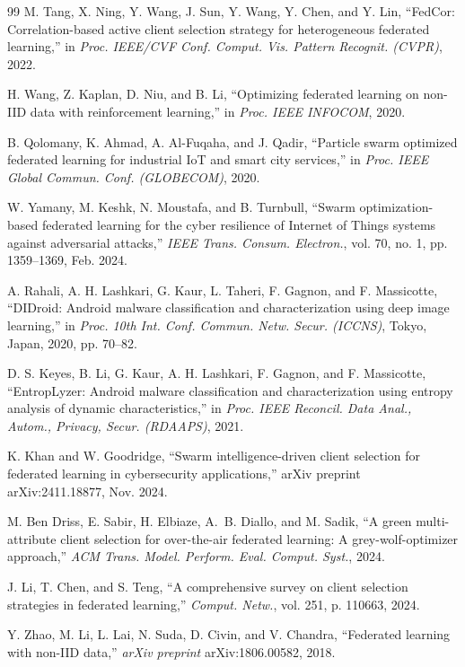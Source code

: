 \documentclass[conference]{IEEEtran}
\begin{document}
\begin{thebibliography}{99}
M. Tang, X. Ning, Y. Wang, J. Sun, Y. Wang, Y. Chen, and Y. Lin, ``FedCor: Correlation-based active client selection strategy for heterogeneous federated learning,'' in \emph{Proc. IEEE/CVF Conf. Comput. Vis. Pattern Recognit. (CVPR)}, 2022.

H. Wang, Z. Kaplan, D. Niu, and B. Li, ``Optimizing federated learning on non-IID data with reinforcement learning,'' in \emph{Proc. IEEE INFOCOM}, 2020.

B. Qolomany, K. Ahmad, A. Al-Fuqaha, and J. Qadir, ``Particle swarm optimized federated learning for industrial IoT and smart city services,'' in \emph{Proc. IEEE Global Commun. Conf. (GLOBECOM)}, 2020.

W. Yamany, M. Keshk, N. Moustafa, and B. Turnbull, ``Swarm optimization-based federated learning for the cyber resilience of Internet of Things systems against adversarial attacks,'' \emph{IEEE Trans. Consum. Electron.}, vol. 70, no. 1, pp. 1359--1369, Feb. 2024.

A. Rahali, A. H. Lashkari, G. Kaur, L. Taheri, F. Gagnon, and F. Massicotte, ``DIDroid: Android malware classification and characterization using deep image learning,'' in \emph{Proc. 10th Int. Conf. Commun. Netw. Secur. (ICCNS)}, Tokyo, Japan, 2020, pp. 70--82.

D. S. Keyes, B. Li, G. Kaur, A. H. Lashkari, F. Gagnon, and F. Massicotte, ``EntropLyzer: Android malware classification and characterization using entropy analysis of dynamic characteristics,'' in \emph{Proc. IEEE Reconcil. Data Anal., Autom., Privacy, Secur. (RDAAPS)}, 2021.

K. Khan and W. Goodridge, ``Swarm intelligence-driven client selection for federated learning in cybersecurity applications,'' arXiv preprint arXiv:2411.18877, Nov. 2024.

M. Ben Driss, E. Sabir, H. Elbiaze, A.~B. Diallo, and M. Sadik, ``A green multi-attribute client selection for over-the-air federated learning: A grey-wolf-optimizer approach,'' \emph{ACM Trans. Model. Perform. Eval. Comput. Syst.}, 2024.

J. Li, T. Chen, and S. Teng, ``A comprehensive survey on client selection strategies in federated learning,'' \emph{Comput. Netw.}, vol. 251, p. 110663, 2024.

Y. Zhao, M. Li, L. Lai, N. Suda, D. Civin, and V. Chandra, ``Federated learning with non-IID data,'' \emph{arXiv preprint} arXiv:1806.00582, 2018.


\end{thebibliography}
\end{document}
